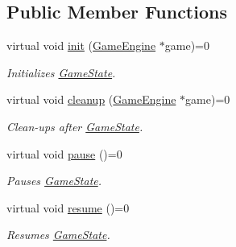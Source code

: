 \subsection*{Public Member Functions}
\begin{DoxyCompactItemize}
\item 
\mbox{\label{class_game_state_a10b6e6bb31591c70d08ffcee5f29fa81}} 
virtual void \mbox{\hyperlink{class_game_state_a10b6e6bb31591c70d08ffcee5f29fa81}{init}} (\mbox{\hyperlink{class_game_engine}{Game\+Engine}} $\ast$game)=0
\begin{DoxyCompactList}\small\item\em Initializes \mbox{\hyperlink{class_game_state}{Game\+State}}. \end{DoxyCompactList}\item 
\mbox{\label{class_game_state_a7df4ea0b4815d2b3b35dbec2a399a0b6}} 
virtual void \mbox{\hyperlink{class_game_state_a7df4ea0b4815d2b3b35dbec2a399a0b6}{cleanup}} (\mbox{\hyperlink{class_game_engine}{Game\+Engine}} $\ast$game)=0
\begin{DoxyCompactList}\small\item\em Clean-\/ups after \mbox{\hyperlink{class_game_state}{Game\+State}}. \end{DoxyCompactList}\item 
\mbox{\label{class_game_state_aafc908582760099891b37bb380ddd87a}} 
virtual void \mbox{\hyperlink{class_game_state_aafc908582760099891b37bb380ddd87a}{pause}} ()=0
\begin{DoxyCompactList}\small\item\em Pauses \mbox{\hyperlink{class_game_state}{Game\+State}}. \end{DoxyCompactList}\item 
\mbox{\label{class_game_state_a4a421c44f4dae6e9a4fbe10b6e8c47ac}} 
virtual void \mbox{\hyperlink{class_game_state_a4a421c44f4dae6e9a4fbe10b6e8c47ac}{resume}} ()=0
\begin{DoxyCompactList}\small\item\em Resumes \mbox{\hyperlink{class_game_state}{Game\+State}}. \end{DoxyCompactList}\item 
\mbox{\label{class_game_state_a3ef0638514dbfe71581d593cf0f66ce5}} 

\end{DoxyCompactItemize}

